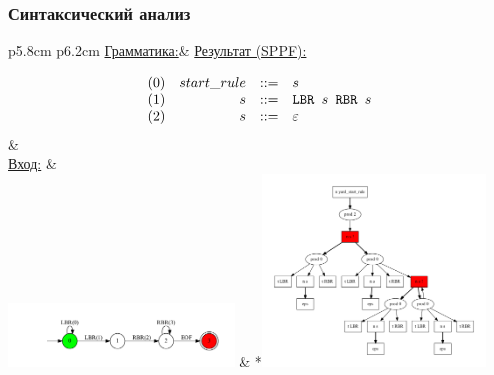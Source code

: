 \documentclass{beamer}
\begin{document}
\begin{frame}[fragile]
	\transwipe[direction=90]
	\frametitle{Синтаксический анализ}

	    \begin{tabular}{p{5.8cm} p{6.2cm}}
		\underline{Грамматика:}& \underline{Результат (SPPF):}
		\vspace{-20pt}
		\\
		\vspace{-20pt}
		
		$$
		\begin{array}{crcl}
		(0)& start\_rule &::=& s \\
		(1)& s & ::= & \mbox{\texttt{LBR }} s \mbox{\texttt{ RBR }} s\\
		(2)& s & ::= &\varepsilon
		\end{array}
		$$
		&
		\\      
		\underline{Вход:} \vspace{10pt}&
		\\
		\includegraphics[width=170pt]{pictures/parser_input.pdf}
		& *{\!\includegraphics[width=168pt]{pictures/parser_output.pdf}}
	\end{tabular}

\end{frame}
\end{document}
